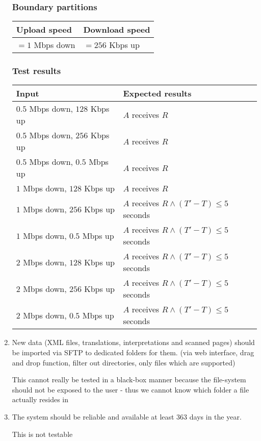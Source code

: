 \documentclass[10pt,a4paper]{report}
\begin{document}
\begin{enumerate}
        \subsubsection*{Boundary partitions}
        \begin{tabular}{|l|l|}
            \hline
            Upload speed & Download speed\\
            \hline
            $=1$ Mbps down & $=256$ Kbps up\\
            \hline
        \end{tabular}
        \subsubsection*{Test results}
        \begin{tabular}{|l|l|}
            \hline
            Input & Expected results\\
            \hline
            $0.5$ Mbps down, $128$ Kbps up & $A$ receives $R$\\
            $0.5$ Mbps down, $256$ Kbps up & $A$ receives $R$\\
            $0.5$ Mbps down, $0.5$ Mbps up & $A$ receives $R$\\
            $1$ Mbps down, $128$ Kbps up & $A$ receives $R$\\
            $1$ Mbps down, $256$ Kbps up & $A$ receives $R \wedge (T' - T) \leq 5$ seconds\\
            $1$ Mbps down, $0.5$ Mbps up & $A$ receives $R \wedge (T' - T) \leq 5$ seconds\\
            $2$ Mbps down, $128$ Kbps up & $A$ receives $R \wedge (T' - T) \leq 5$ seconds\\
            $2$ Mbps down, $256$ Kbps up & $A$ receives $R \wedge (T' - T) \leq 5$ seconds\\
            $2$ Mbps down, $0.5$ Mbps up & $A$ receives $R \wedge (T' - T) \leq 5$ seconds\\
            \hline
        \end{tabular}
    \item New data (XML files, translations, interpretations and scanned pages) should be
    imported via SFTP to dedicated folders for them. (via web interface, drag and
    drop function, filter out directories, only files which are supported)
    
    This cannot really be tested in a black-box manner because the file-system should not be exposed to the user - thus we cannot know which folder a file actually resides in
    
    \item The system should be reliable and available at least 363 days in the year.
    
    This is not testable
\end{enumerate}
\end{document}
